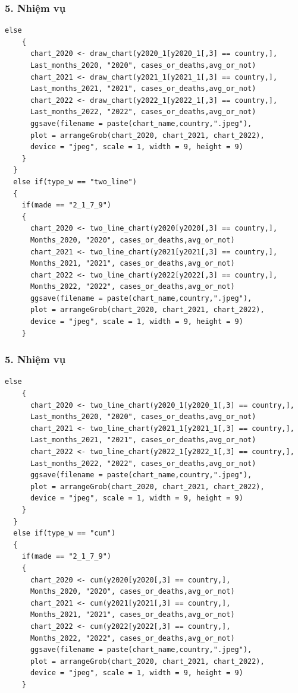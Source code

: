 \documentclass[english,10pt,table]{beamer}
\begin{document}
\begin{frame}[fragile]
\frametitle{5.  Nhiệm vụ}
\begin{lstlisting}[frame = single,basicstyle=\tiny]
 else
    {
      chart_2020 <- draw_chart(y2020_1[y2020_1[,3] == country,],
      Last_months_2020, "2020", cases_or_deaths,avg_or_not)
      chart_2021 <- draw_chart(y2021_1[y2021_1[,3] == country,],
      Last_months_2021, "2021", cases_or_deaths,avg_or_not)
      chart_2022 <- draw_chart(y2022_1[y2022_1[,3] == country,],
      Last_months_2022, "2022", cases_or_deaths,avg_or_not)
      ggsave(filename = paste(chart_name,country,".jpeg"), 
      plot = arrangeGrob(chart_2020, chart_2021, chart_2022), 
      device = "jpeg", scale = 1, width = 9, height = 9)
    }
  }
  else if(type_w == "two_line")
  {
    if(made == "2_1_7_9")
    {
      chart_2020 <- two_line_chart(y2020[y2020[,3] == country,], 
      Months_2020, "2020", cases_or_deaths,avg_or_not)
      chart_2021 <- two_line_chart(y2021[y2021[,3] == country,], 
      Months_2021, "2021", cases_or_deaths,avg_or_not)
      chart_2022 <- two_line_chart(y2022[y2022[,3] == country,], 
      Months_2022, "2022", cases_or_deaths,avg_or_not)
      ggsave(filename = paste(chart_name,country,".jpeg"), 
      plot = arrangeGrob(chart_2020, chart_2021, chart_2022), 
      device = "jpeg", scale = 1, width = 9, height = 9)
    }
\end{lstlisting}
\end{frame}

\begin{frame}[fragile]
\frametitle{5.  Nhiệm vụ}
\begin{lstlisting}[frame = single,basicstyle=\tiny]
 else
    {
      chart_2020 <- two_line_chart(y2020_1[y2020_1[,3] == country,],
      Last_months_2020, "2020", cases_or_deaths,avg_or_not)
      chart_2021 <- two_line_chart(y2021_1[y2021_1[,3] == country,],
      Last_months_2021, "2021", cases_or_deaths,avg_or_not)
      chart_2022 <- two_line_chart(y2022_1[y2022_1[,3] == country,],
      Last_months_2022, "2022", cases_or_deaths,avg_or_not)
      ggsave(filename = paste(chart_name,country,".jpeg"), 
      plot = arrangeGrob(chart_2020, chart_2021, chart_2022), 
      device = "jpeg", scale = 1, width = 9, height = 9)
    }
  }
  else if(type_w == "cum") 
  {
    if(made == "2_1_7_9")
    {
      chart_2020 <- cum(y2020[y2020[,3] == country,],
      Months_2020, "2020", cases_or_deaths,avg_or_not)
      chart_2021 <- cum(y2021[y2021[,3] == country,], 
      Months_2021, "2021", cases_or_deaths,avg_or_not)
      chart_2022 <- cum(y2022[y2022[,3] == country,], 
      Months_2022, "2022", cases_or_deaths,avg_or_not)
      ggsave(filename = paste(chart_name,country,".jpeg"), 
      plot = arrangeGrob(chart_2020, chart_2021, chart_2022), 
      device = "jpeg", scale = 1, width = 9, height = 9)
    }
\end{lstlisting}
\end{frame}
\end{document}
